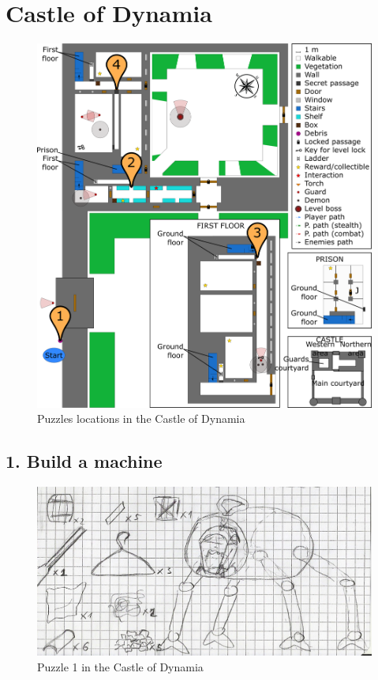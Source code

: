 \section{Castle of Dynamia}

\begin{figure}[H]
  \centering
  \includegraphics[width=\textwidth]{Images/Maps/castleOfDynamiaPuzzles}
  \caption{Puzzles locations in the Castle of Dynamia}
\end{figure}

\subsection{1. Build a machine}

\begin{figure}[H]
  \centering
  \includegraphics[width=\textwidth]{Images/Puzzles/castleOfDynamia_1}
  \caption{Puzzle 1 in the Castle of Dynamia}
\end{figure}

